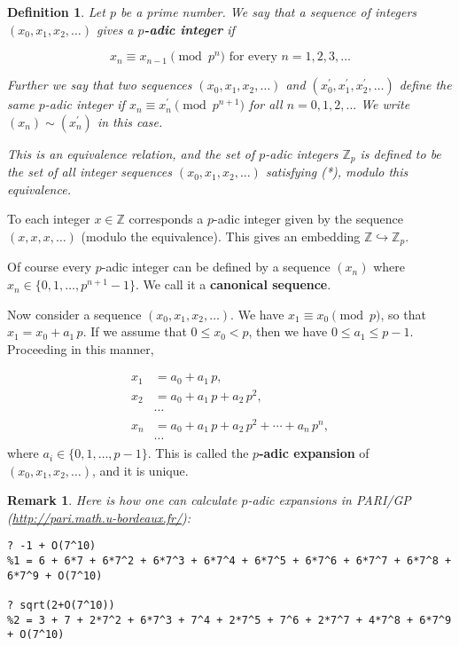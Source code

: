 \documentclass{article}
\newcommand{\term}{\textbf}
\newcommand{\ZZ}{\mathbb{Z}}
\theoremstyle{myplain}
\theoremstyle{mydefinition}
\newtheorem{definition}[proposition]{Definition}
\newtheorem{remark}[proposition]{Remark}
\begin{document}
\begin{definition}
  Let $p$ be a prime number. We say that a sequence of integers
  $(x_0, x_1, x_2, \ldots)$ gives a \term{$p$-adic integer} if

  \[ \tag{*} x_n \equiv x_{n-1} \pmod{p^n}\text{ for every }n = 1, 2, 3, \ldots \]

  Further we say that two sequences $(x_0, x_1, x_2, \ldots)$ and
  $(x_0^\prime, x_1^\prime, x_2^\prime, \ldots)$ define the same $p$-adic
  integer if $x_n \equiv x_n^\prime \pmod{p^{n+1}}$ for all
  $n = 0, 1, 2, \ldots$ We write $(x_n) \sim (x_n^\prime)$ in this case.

  This is an equivalence relation, and the set of $p$-adic integers $\ZZ_p$ is
  defined to be the set of all integer sequences $(x_0,x_1,x_2,\ldots)$
  satisfying (*), modulo this equivalence.
\end{definition}

To each integer $x\in \ZZ$ corresponds a $p$-adic integer given by the sequence
$(x,x,x,\ldots)$ (modulo the equivalence). This gives an embedding
$\ZZ \hookrightarrow \ZZ_p$.

Of course every $p$-adic integer can be defined by a sequence $(x_n)$ where
$x_n \in \{ 0, 1, \ldots, p^{n+1} - 1 \}$. We call it a
\term{canonical sequence}.

Now consider a sequence $(x_0,x_1,x_2,\ldots)$. We have
$x_1 \equiv x_0 \pmod p$, so that $x_1 = x_0 + a_1\,p$. If we assume that
$0 \le x_0 < p$, then we have $0 \le a_1 \le p-1$. Proceeding in this manner,

\begin{align*}
x_1 & = a_0 + a_1\,p,\\
x_2 & = a_0 + a_1\,p + a_2\,p^2,\\
 & \cdots\\
x_n & = a_0 + a_1\,p + a_2\,p^2 + \cdots + a_n\,p^n,\\
 & \cdots
\end{align*}
where $a_i \in \{ 0, 1, \ldots, p-1 \}$. This is called the
\term{$p$-adic expansion} of $(x_0,x_1,x_2,\ldots)$, and it is unique.

\begin{remark}
  Here is how one can calculate $p$-adic expansions in PARI/GP
  (\url{http://pari.math.u-bordeaux.fr/}):

\begin{verbatim}
? -1 + O(7^10)
%1 = 6 + 6*7 + 6*7^2 + 6*7^3 + 6*7^4 + 6*7^5 + 6*7^6 + 6*7^7 + 6*7^8 + 6*7^9 + O(7^10)

? sqrt(2+O(7^10))
%2 = 3 + 7 + 2*7^2 + 6*7^3 + 7^4 + 2*7^5 + 7^6 + 2*7^7 + 4*7^8 + 6*7^9 + O(7^10)
\end{verbatim}
\end{remark}
\end{document}
